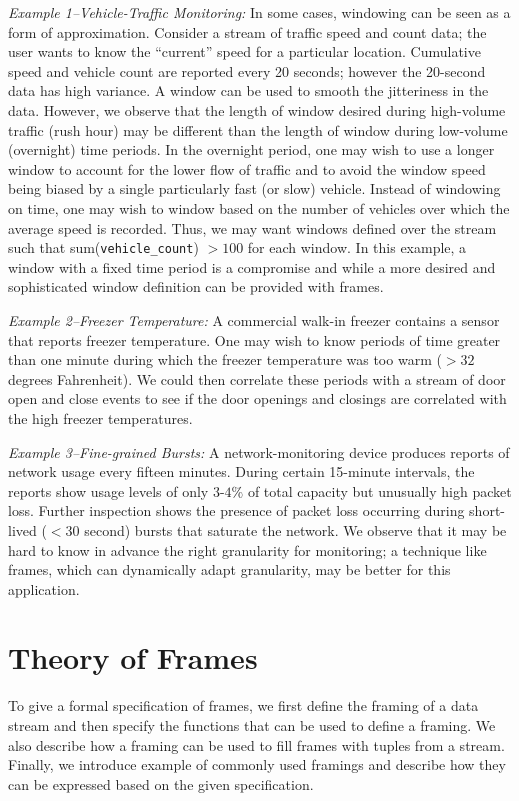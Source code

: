 \documentclass{vldb}
\begin{document}
\emph{Example 1--Vehicle-Traffic Monitoring:} In some cases, windowing can be seen as a form of approximation. Consider a stream of traffic speed and count data; the user wants to know the “current” speed for a particular location. Cumulative speed and vehicle count are reported every 20 seconds; however the 20-second data has high variance. A window can be used to smooth the jitteriness in the data. However, we observe that the length of window desired during high-volume traffic (rush hour) may be different than the length of window during low-volume (overnight) time periods. In the overnight period, one may wish to use a longer window to account for the lower flow of traffic and to avoid the window speed being biased by a single particularly fast (or slow) vehicle. Instead of windowing on time, one may wish to window based on the number of vehicles over which the average speed is recorded. Thus, we may want windows defined over the stream such that sum(\texttt{vehicle\_count}) $> 100$ for each window. In this example, a window with a fixed time period is a compromise and while a more desired and sophisticated window definition can be provided with frames.

\emph{Example 2--Freezer Temperature:} A commercial walk-in freezer contains a sensor that reports freezer temperature. One may wish to know periods of time greater than one minute during which the freezer temperature was too warm ($> 32$ degrees Fahrenheit). We could then correlate these periods with a stream of door open and close events to see if the door openings and closings are correlated with the high freezer temperatures. 

\emph{Example 3--Fine-grained Bursts:} A network-monitoring device produces reports of network usage every fifteen minutes. During certain 15-minute intervals, the reports show usage levels of only $3$-$4\%$ of total capacity but unusually high packet loss. Further inspection shows the presence of packet loss occurring during short-lived ($< 30$ second) bursts that saturate the network. We observe that it may be hard to know in advance the right granularity for monitoring; a technique like frames, which can dynamically adapt granularity, may be better for this application.

\section{Theory of Frames}
\label{sec:theory}

To give a formal specification of frames, we first define the framing of a data stream and then specify the functions that can be used to define a framing. We also describe how a framing can be used to fill frames with tuples from a stream. Finally, we introduce example of commonly used framings and describe how they can be expressed based on the given specification.
\end{document}
